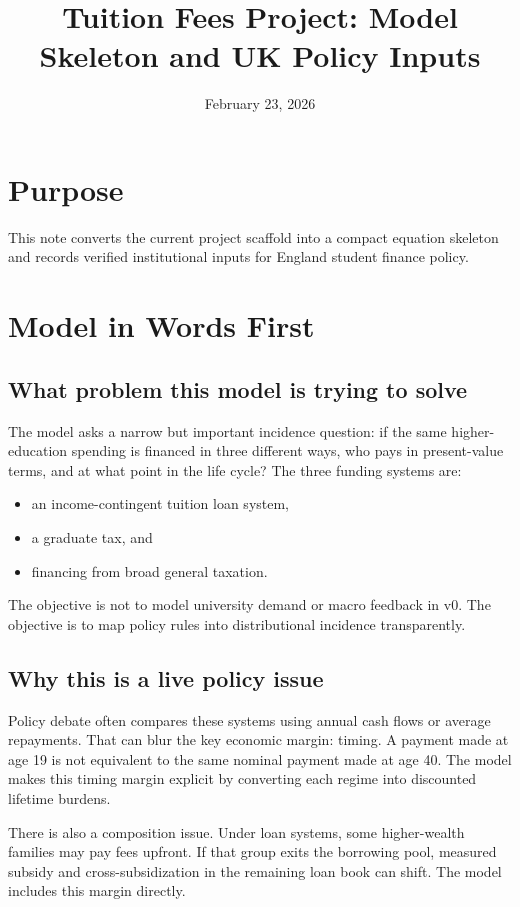 \documentclass[11pt]{article}
\title{Tuition Fees Project: Model Skeleton and UK Policy Inputs}
\author{}
\date{February 23, 2026}
\begin{document}
\maketitle

\section{Purpose}
This note converts the current project scaffold into a compact equation skeleton and records verified institutional inputs for England student finance policy.

\section{Model in Words First}
\subsection{What problem this model is trying to solve}
The model asks a narrow but important incidence question: if the same higher-education spending is financed in three different ways, who pays in present-value terms, and at what point in the life cycle? The three funding systems are:
\begin{itemize}
\item an income-contingent tuition loan system,
\item a graduate tax, and
\item financing from broad general taxation.
\end{itemize}
The objective is not to model university demand or macro feedback in v0. The objective is to map policy rules into distributional incidence transparently.

\subsection{Why this is a live policy issue}
Policy debate often compares these systems using annual cash flows or average repayments. That can blur the key economic margin: timing. A payment made at age 19 is not equivalent to the same nominal payment made at age 40. The model makes this timing margin explicit by converting each regime into discounted lifetime burdens.

There is also a composition issue. Under loan systems, some higher-wealth families may pay fees upfront. If that group exits the borrowing pool, measured subsidy and cross-subsidization in the remaining loan book can shift. The model includes this margin directly.
\end{document}
